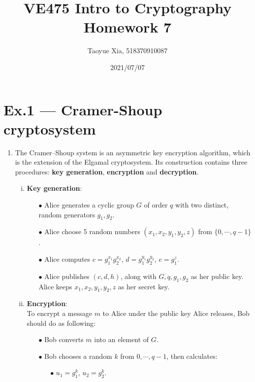\documentclass[12pt, a4paper]{article}
\begin{document}
\title{VE475 Intro to Cryptography Homework 7}
\author{Taoyue Xia, 518370910087}
\date{2021/07/07}
\maketitle

\section*{Ex.1 --- Cramer-Shoup cryptosystem}
\begin{enumerate}
    \item The Cramer–Shoup system is an asymmetric key encryption algorithm, which is the extension of the Elgamal cryptosystem. 
          Its construction contains three procedures: \textbf{key generation}, \textbf{encryption} and \textbf{decryption}.
          \begin{enumerate}[(i)]
              \item \textbf{Key generation}:
                    \begin{itemize}
                        \item[$\bullet$] Alice generates a cyclic group $G$ of order $q$ with two distinct, 
                        random generators $g_1, g_2$.
                        \item[$\bullet$] Alice choose 5 random numbers $(x_1,x_2,y_1,y_2,z)$ from $\{0,\cdots,q-1\}$.
                        \item[$\bullet$] Alice computes $c = g_1^{x_1}g_2^{x_2}$, $d = g_1^{y_1}g_2^{y_2}$, $e = g_1^z$. 
                        \item[$\bullet$] Alice publishes $(c,d,h)$, along with $G,q,g_1,g_2$ as her public key. 
                        Alice keeps $x_1,x_2,y_1,y_2,z$ as her secret key.
                    \end{itemize}
              \item \textbf{Encryption}:\\
                    To encrypt a message $m$ to Alice under the public key Alice releases, Bob should do as following:
                    \begin{itemize}
                        \item[$\bullet$] Bob converts $m$ into an element of $G$.
                        \item[$\bullet$] Bob chooses a random $k$ from $0,\cdots,q-1$, then calculates:
                        \begin{itemize}
                            \item[$\bullet$] $u_1 = g_1^k$, $u_2 = g_2^k$.

\end{itemize}
\end{itemize}
\end{enumerate}
\end{enumerate}
\end{document}
